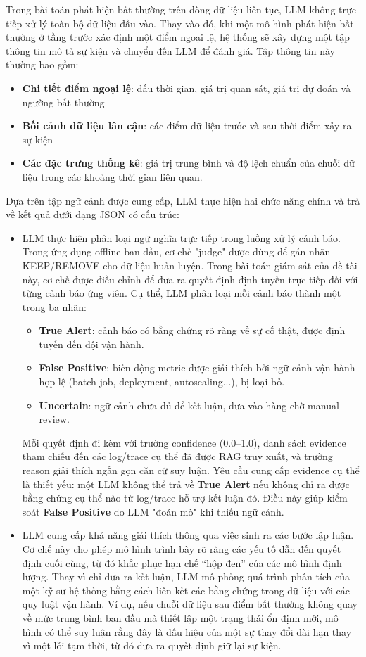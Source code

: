 Trong bài toán phát hiện bất thường trên dòng dữ liệu liên tục, LLM không trực tiếp xử lý toàn bộ dữ liệu đầu vào. Thay vào đó, khi một mô hình phát hiện bất thường ở tầng trước xác định một điểm ngoại lệ, hệ thống sẽ xây dựng một tập thông tin mô tả sự kiện và chuyển đến LLM để đánh giá. Tập thông tin này thường bao gồm: 
\begin{itemize}[label=--]
    \item \textbf{Chi tiết điểm ngoại lệ}: dấu thời gian, giá trị quan sát, giá trị dự đoán và ngưỡng bất thường
    \item \textbf{Bối cảnh dữ liệu lân cận}: các điểm dữ liệu trước và sau thời điểm xảy ra sự kiện
    \item \textbf{Các đặc trưng thống kê}: giá trị trung bình và độ lệch chuẩn của chuỗi dữ liệu trong các khoảng thời gian liên quan.
\end{itemize}
Dựa trên tập ngữ cảnh được cung cấp, LLM thực hiện hai chức năng chính và trả về kết quả dưới dạng JSON có cấu trúc:
\begin{itemize}[label=--]
    \item LLM thực hiện phân loại ngữ nghĩa trực tiếp trong luồng xử lý cảnh báo. Trong ứng dụng offline ban đầu, cơ chế "judge" được dùng để gán nhãn KEEP/REMOVE cho dữ liệu huấn luyện. Trong bài toán giám sát của đề tài này, cơ chế được điều chỉnh để đưa ra quyết định định tuyến trực tiếp đối với từng cảnh báo ứng viên. Cụ thể, LLM phân loại mỗi cảnh báo thành một trong ba nhãn:

    \begin{itemize}
        \item \textbf{True Alert}: cảnh báo có bằng chứng rõ ràng về sự cố thật, được định tuyến đến đội vận hành.
        \item \textbf{False Positive}: biến động metric được giải thích bởi ngữ cảnh vận hành hợp lệ (batch job, deployment, autoscaling...), bị loại bỏ.
        \item \textbf{Uncertain}: ngữ cảnh chưa đủ để kết luận, đưa vào hàng chờ manual review.
    \end{itemize}
Mỗi quyết định đi kèm với trường confidence (0.0–1.0), danh sách evidence tham chiếu đến các log/trace cụ thể đã được RAG truy xuất, và trường reason giải thích ngắn gọn căn cứ suy luận. Yêu cầu cung cấp evidence cụ thể là thiết yếu: một LLM không thể trả về \textbf{True Alert} nếu không chỉ ra được bằng chứng cụ thể nào từ log/trace hỗ trợ kết luận đó. Điều này giúp kiểm soát \textbf{False Positive} do LLM "đoán mò" khi thiếu ngữ cảnh.
    \item LLM cung cấp khả năng giải thích thông qua việc sinh ra các bước lập luận. Cơ chế này cho phép mô hình trình bày rõ ràng các yếu tố dẫn đến quyết định cuối cùng, từ đó khắc phục hạn chế “hộp đen” của các mô hình định lượng. Thay vì chỉ đưa ra kết luận, LLM mô phỏng quá trình phân tích của một kỹ sư hệ thống bằng cách liên kết các bằng chứng trong dữ liệu với các quy luật vận hành. Ví dụ, nếu chuỗi dữ liệu sau điểm bất thường không quay về mức trung bình ban đầu mà thiết lập một trạng thái ổn định mới, mô hình có thể suy luận rằng đây là dấu hiệu của một sự thay đổi dài hạn thay vì một lỗi tạm thời, từ đó đưa ra quyết định giữ lại sự kiện.
\end{itemize}
